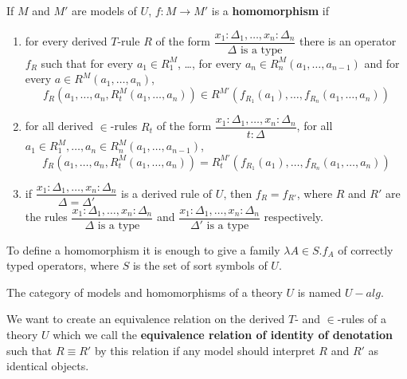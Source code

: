 \begin{definition}
    If $M$ and $M'$ are models of $U$, $f : M \to M'$
    is a \textbf{homomorphism} if
    \begin{enumerate}
        \item for every derived $T$-rule $R$ of the form \(
                \dfrac{
                    x_1 : \Delta_1, \dots, x_n : \Delta_n
                }{
                    \Delta \text{ is a type}
                }
            \) there is an operator $f_R$ such that
            for every $a_1 \in R_1^M$, \dots, for every $a_n \in R_n^M(a_1, \dots, a_{n-1})$
            and for every $a \in R^M(a_1, \dots, a_n)$,
            \[
                f_R(a_1, \dots, a_n, R_t^M(a_1, \dots, a_n)) \in
                R^{M'}(f_{R_1}(a_1), \dots, f_{R_n}(a_1, \dots, a_n))
            \]
        \item for all derived $\in$-rules $R_t$ of the form \(
                \dfrac{
                    x_1 : \Delta_1, \dots, x_n : \Delta_n
                }{
                    t : \Delta
                }
            \), for all $a_1 \in R_1^M, \dots, a_n \in R_n^M(a_1, \dots, a_{n-1})$,
            \begin{equation*}
                f_R(a_1, \dots, a_n, R_t^M(a_1, \dots, a_n)) =
                R_t^{M'}(f_{R_1}(a_1), \dots, f_{R_n}(a_1, \dots, a_n))
            \end{equation*}
        \item if \(
                \dfrac{
                    x_1 : \Delta_1, \dots, x_n : \Delta_n
                }{
                    \Delta = \Delta'
                }
            \) is a derived rule of $U$, then $f_R = f_{R'}$,
            where $R$ and $R'$ are the rules \(
                \dfrac{
                    x_1 : \Delta_1, \dots, x_n : \Delta_n
                }{\Delta \text{ is a type}}
            \) and \(
                \dfrac{
                    x_1 : \Delta_1, \dots, x_n : \Delta_n
                }{\Delta' \text{ is a type}}
            \) respectively.
    \end{enumerate}
\end{definition}

To define a homomorphism it is enough to give a family 
$\lambda A \in S. f_A$ of correctly typed operators, where
$S$ is the set of sort symbols of $U$.

The category of models and homomorphisms of a theory $U$ is named $U-alg$.

We want to create an equivalence relation on the derived $T$- and $\in$-rules
of a theory $U$ which we call the \textbf{equivalence relation of identity of denotation}
such that $R \equiv R'$ by this relation if any model should 
interpret $R$ and $R'$ as identical objects.

